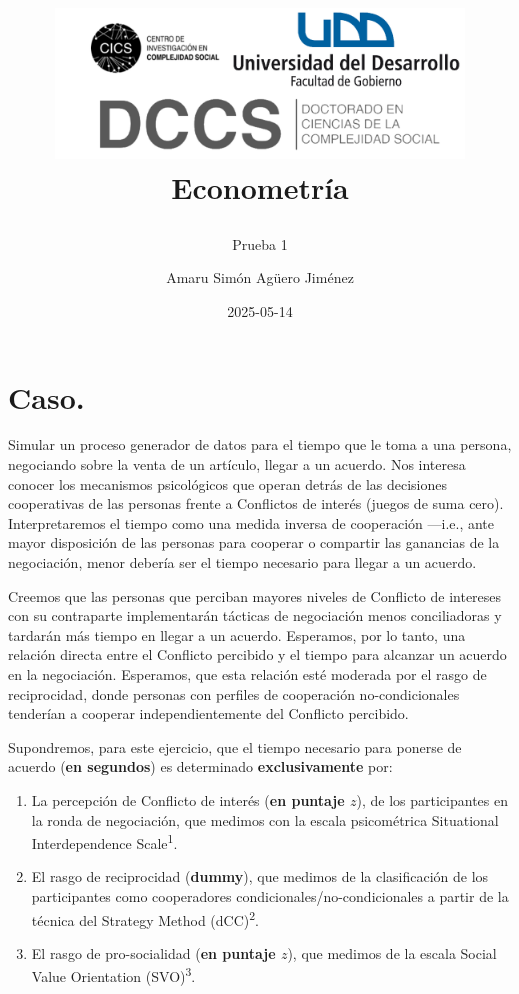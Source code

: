 \documentclass[
  spanish,
  10pt,
]{article}
\title{\begin{center}
  \includegraphics[height=4cm]{logo.png} \\[1cm]
  \Large Econometría \\
\end{center}}
\subtitle{Prueba 1}
\author{Amaru Simón Agüero Jiménez}
\date{2025-05-14}
\renewcommand*\contentsname{Tabla de contenidos}
\newcommand\contentsname{Tabla de contenidos}
\begin{document}
\maketitle

\renewcommand*\contentsname{Tabla de contenidos}
{
\hypersetup{linkcolor=}
\setcounter{tocdepth}{3}
\tableofcontents
}

\section{Caso.}\label{caso.}

Simular un proceso generador de datos para el tiempo que le toma a una
persona, negociando sobre la venta de un artículo, llegar a un acuerdo.
Nos interesa conocer los mecanismos psicológicos que operan detrás de
las decisiones cooperativas de las personas frente a Conflictos de
interés (juegos de suma cero). Interpretaremos el tiempo como una medida
inversa de cooperación ---i.e., ante mayor disposición de las personas
para cooperar o compartir las ganancias de la negociación, menor debería
ser el tiempo necesario para llegar a un acuerdo.

Creemos que las personas que perciban mayores niveles de Conflicto de
intereses con su contraparte implementarán tácticas de negociación menos
conciliadoras y tardarán más tiempo en llegar a un acuerdo. Esperamos,
por lo tanto, una relación directa entre el Conflicto percibido y el
tiempo para alcanzar un acuerdo en la negociación. Esperamos, que esta
relación esté moderada por el rasgo de reciprocidad, donde personas con
perfiles de cooperación no-condicionales tenderían a cooperar
independientemente del Conflicto percibido.

Supondremos, para este ejercicio, que el tiempo necesario para ponerse
de acuerdo (\textbf{en segundos}) es determinado \textbf{exclusivamente}
por:

\begin{enumerate}
\def\labelenumi{\arabic{enumi}.}
\item
  La percepción de Conflicto de interés (\textbf{en puntaje \(z\)}), de
  los participantes en la ronda de negociación, que medimos con la
  escala psicométrica Situational Interdependence
  Scale\textsuperscript{1}.
\item
  El rasgo de reciprocidad (\textbf{dummy}), que medimos de la
  clasificación de los participantes como cooperadores
  condicionales/no-condicionales a partir de la técnica del Strategy
  Method (dCC)\textsuperscript{2}.
\item
  El rasgo de pro-socialidad (\textbf{en puntaje \(z\)}), que medimos de
  la escala Social Value Orientation (SVO)\textsuperscript{3}.
\end{enumerate}
\end{document}
